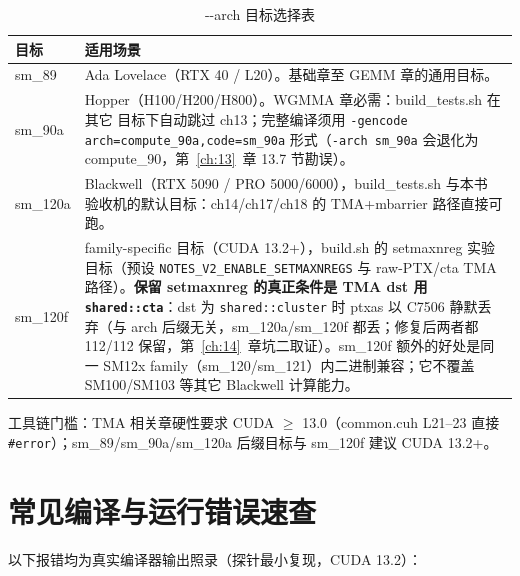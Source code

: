 \begin{table}[htbp]
\centering\small
\caption{-{}-arch 目标选择表}\label{tab:appC-arch}
\begin{tabular}{lp{8.6cm}}
\toprule
目标 & 适用场景 \\
\midrule
sm\_89 & Ada Lovelace（RTX 40 / L20）。基础章至 GEMM 章的通用目标。 \\
sm\_90a & Hopper（H100/H200/H800）。WGMMA 章必需：build\_tests.sh 在其它
  目标下自动跳过 ch13；完整编译须用 \texttt{-gencode
  arch=\allowbreak{}compute\_\allowbreak{}90a,\allowbreak{}code=\allowbreak{}sm\_\allowbreak{}90a} 形式（\texttt{-arch sm\_90a} 会退化为
  compute\_90，第~\ref{ch:13}~章 13.7 节勘误）。 \\
sm\_120a & Blackwell（RTX 5090 / PRO 5000/6000），build\_tests.sh 与本书
  验收机的默认目标：ch14/ch17/ch18 的 TMA+mbarrier 路径直接可跑。 \\
sm\_120f & family-specific 目标（CUDA 13.2+），build.sh 的 setmaxnreg
  实验目标（预设 \texttt{NOTES\_\allowbreak{}V2\_\allowbreak{}ENABLE\_\allowbreak{}SETMAXNREGS} 与
  raw-PTX/cta TMA 路径）。\textbf{保留 setmaxnreg 的真正条件是 TMA dst 用
  \texttt{shared::cta}}：dst 为 \texttt{shared::cluster} 时 ptxas 以 C7506
  静默丢弃（与 arch 后缀无关，sm\_120a/sm\_120f 都丢；修复后两者都 112/112
  保留，第~\ref{ch:14}~章坑二取证）。sm\_120f 额外的好处是同一 SM12x
  family（sm\_120/sm\_121）内二进制兼容；它不覆盖 SM100/SM103 等其它 Blackwell 计算能力。 \\
\bottomrule
\end{tabular}
\end{table}

工具链门槛：TMA 相关章硬性要求 CUDA $\ge$ 13.0（common.cuh L21--23 直接
\texttt{\#error}）；sm\_89/sm\_90a/sm\_120a 后缀目标与 sm\_120f 建议
CUDA 13.2+。

\section{常见编译与运行错误速查}

以下报错均为真实编译器输出照录（探针最小复现，CUDA 13.2）：


